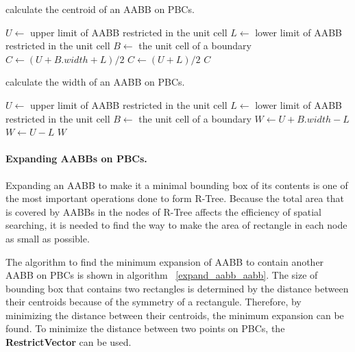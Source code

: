 \documentclass[10pt,letterpaper,twocolumn]{article}
\begin{document}
\begin{algorithm}
    \caption{calculate the centroid of an AABB on PBCs.}
    \label{centroid_aabb}
    \begin{algorithmic}
        \State $U \gets$ upper limit of AABB restricted in the unit cell
        \State $L \gets$ lower limit of AABB restricted in the unit cell
        \State $B \gets$ the unit cell of a boundary
                \State $C \gets (U + B.width + L) / 2$
            \Else
                \State $C \gets (U + L) / 2$
            \EndIf
            \State \Return $C$
        \EndFunction
     \end{algorithmic}
\end{algorithm}

\begin{algorithm}
    \caption{calculate the width of an AABB on PBCs.}
    \label{width_aabb}
    \begin{algorithmic}
        \State $U \gets$ upper limit of AABB restricted in the unit cell
        \State $L \gets$ lower limit of AABB restricted in the unit cell
        \State $B \gets$ the unit cell of a boundary
                \State $W \gets U + B.width - L$
            \Else
                \State $W \gets U - L$
            \EndIf
            \State \Return $W$
        \EndFunction
     \end{algorithmic}
\end{algorithm}

\paragraph{Expanding AABBs on PBCs.}
Expanding an AABB to make it a minimal bounding box of its contents is one of
the most important operations done to form R-Tree.
Because the total area that is covered by AABBs in the nodes of R-Tree affects
the efficiency of spatial searching, it is needed to find the way to make the
area of rectangle in each node as small as possible.

The algorithm to find the minimum expansion of AABB to contain another AABB on
PBCs is shown in algorithm ~\ref{expand_aabb_aabb}.
The size of bounding box that contains two rectangles is determined by the
distance between their centroids because of the symmetry of a rectangule.
Therefore, by minimizing the distance between their centroids, the minimum
expansion can be found. To minimize the distance between two points on PBCs,
the \textbf{RestrictVector} can be used.
\end{document}
